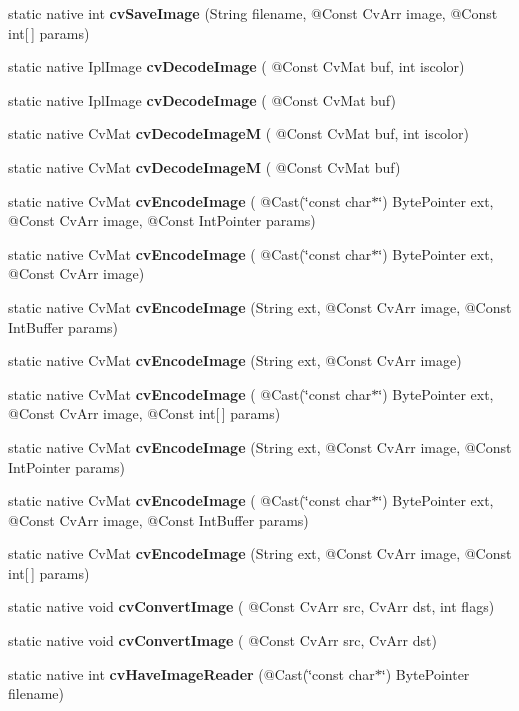 \begin{DoxyCompactItemize}
\item 
static native int {\bfseries cv\+Save\+Image} (String filename, @Const Cv\+Arr image, @Const int\mbox{[}$\,$\mbox{]} params)
\item 
static native Ipl\+Image {\bfseries cv\+Decode\+Image} ( @Const Cv\+Mat buf, int iscolor)
\item 
static native Ipl\+Image {\bfseries cv\+Decode\+Image} ( @Const Cv\+Mat buf)
\item 
static native Cv\+Mat {\bfseries cv\+Decode\+ImageM} ( @Const Cv\+Mat buf, int iscolor)
\item 
static native Cv\+Mat {\bfseries cv\+Decode\+ImageM} ( @Const Cv\+Mat buf)
\item 
static native Cv\+Mat {\bfseries cv\+Encode\+Image} ( @Cast(\char`\"{}const char$\ast$\char`\"{}) Byte\+Pointer ext, @Const Cv\+Arr image, @Const Int\+Pointer params)
\item 
static native Cv\+Mat {\bfseries cv\+Encode\+Image} ( @Cast(\char`\"{}const char$\ast$\char`\"{}) Byte\+Pointer ext, @Const Cv\+Arr image)
\item 
static native Cv\+Mat {\bfseries cv\+Encode\+Image} (String ext, @Const Cv\+Arr image, @Const Int\+Buffer params)
\item 
static native Cv\+Mat {\bfseries cv\+Encode\+Image} (String ext, @Const Cv\+Arr image)
\item 
static native Cv\+Mat {\bfseries cv\+Encode\+Image} ( @Cast(\char`\"{}const char$\ast$\char`\"{}) Byte\+Pointer ext, @Const Cv\+Arr image, @Const int\mbox{[}$\,$\mbox{]} params)
\item 
static native Cv\+Mat {\bfseries cv\+Encode\+Image} (String ext, @Const Cv\+Arr image, @Const Int\+Pointer params)
\item 
static native Cv\+Mat {\bfseries cv\+Encode\+Image} ( @Cast(\char`\"{}const char$\ast$\char`\"{}) Byte\+Pointer ext, @Const Cv\+Arr image, @Const Int\+Buffer params)
\item 
static native Cv\+Mat {\bfseries cv\+Encode\+Image} (String ext, @Const Cv\+Arr image, @Const int\mbox{[}$\,$\mbox{]} params)
\item 
static native void {\bfseries cv\+Convert\+Image} ( @Const Cv\+Arr src, Cv\+Arr dst, int flags)
\item 
static native void {\bfseries cv\+Convert\+Image} ( @Const Cv\+Arr src, Cv\+Arr dst)
\item 
static native int {\bfseries cv\+Have\+Image\+Reader} (@Cast(\char`\"{}const char$\ast$\char`\"{}) Byte\+Pointer filename)

\end{DoxyCompactItemize}
